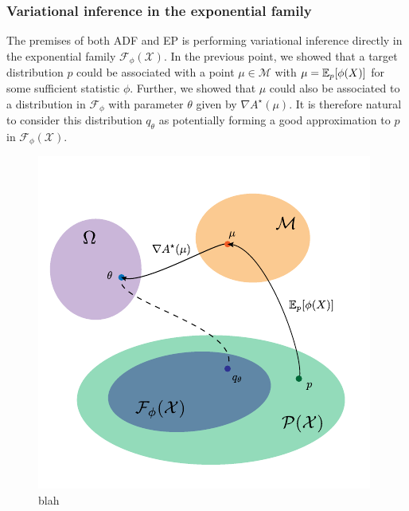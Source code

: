 
\subsubsection{Variational inference in the exponential family}
%
The premises of both ADF and EP is performing variational inference directly in the exponential family $\mathcal F_{\phi}(\mathcal X)$. In the previous point, we showed that a target distribution $p$ could be associated with a point $\mu\in\mathcal M$ with $\mu=\mathbb E_{p}[\phi(X)]$ for some sufficient statistic $\phi$. Further, we showed that $\mu$ could also be associated to a distribution in $\mathcal F_{\phi}$ with parameter $\theta$ given by $\nabla A^{\star}(\mu)$. It is therefore natural to consider this distribution $q_{\theta}$ as potentially forming a good approximation to $p$ in $\mathcal F_{\phi}(\mathcal X)$. 
%
\begin{figure}[!h]
    \center
	\includegraphics[width=.5\textwidth]{figures/expf/mapping2}
\caption{blah}
\end{figure}

